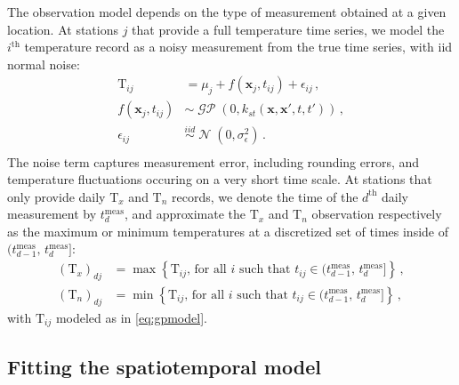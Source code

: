 \documentclass[letter]{article}
\newcommand{\genericdel}[3]{%
      \left#1#3\right#2
    }
\newcommand{\del}[1]{\genericdel(){#1}}
\newcommand{\cbr}[1]{\genericdel\{\}{#1}}
\DeclareMathOperator{\normal}{\mathcal{N}}
\DeclareMathOperator{\GP}{\mathcal{GP}}
\newcommand{\T}{\mathrm{T}}
\newcommand{\Tn}{\T_{n}}
\newcommand{\Tx}{\T_{x}}
\newcommand{\xvec}{\mathbold{x}}
\newcommand{\iid}{iid}
\newcommand{\sigman}{\sigma_{\epsilon}}
\newcommand{\iday}{d}
\newcommand{\tmeas}{t^{\mathrm{meas}}}
\newcommand{\dayset}[1]{(\tmeas_{#1-1},\,\tmeas_{#1}]}
\newcommand{\eqlabel}[1]{\label{#1}}
\begin{document}
The observation model depends on the type of measurement obtained at a given location.
At stations $j$ that provide a full temperature time series, we model the $i^{\mathrm{th}}$ temperature record as a noisy measurement from the true time series, with iid normal noise:
\begin{equation}
\begin{split}
    \T_{ij} &= \mu_{j} + f(\xvec_j, t_{ij}) + \epsilon_{ij}\,,\\
    f(\xvec_j, t_{ij}) &\sim \GP\del{0, k_{st}(\xvec,\xvec',t,t')}\,,\\
    \epsilon_{ij} &\overset{\iid}{\sim} \normal\del{0,\sigman^2}\,.\\
\end{split}
\eqlabel{eq:gpmodel}
\end{equation}
The noise term captures measurement error, including rounding errors, and temperature fluctuations occuring on a very short time scale.
At stations that only provide daily $\Tx$ and $\Tn$ records, 
we denote the time of the $\iday^{\mathrm{th}}$ daily measurement by $\tmeas_{\iday}$, 
and approximate the $\Tx$ and $\Tn$ observation respectively as the maximum or minimum temperatures at a discretized set of times inside of $\dayset{\iday}$:
\begin{equation}
\begin{split}
    \del{\Tx}_{\iday j} &= \max\cbr{\T_{ij}\text{, for all $i$ such that } t_{ij} \in \dayset{\iday}} \,,\\
    \del{\Tn}_{\iday j} &= \min\cbr{\T_{ij}\text{, for all $i$ such that } t_{ij} \in \dayset{\iday}} \,,
\end{split}
\eqlabel{eq:obs_Tn_Tx}
\end{equation}
with $\T_{ij}$ modeled as in \eqref{eq:gpmodel}.

\subsection{Fitting the spatiotemporal model}\label{fitting-the-spatiotemporal-model}
\end{document}
